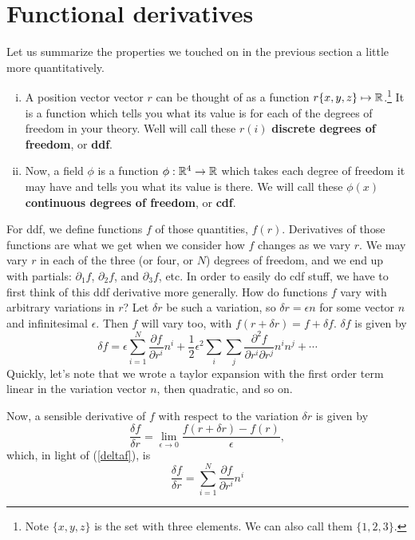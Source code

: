 \documentclass[main.tex]{subfiles}
\begin{document}
\section{Functional derivatives}
Let us summarize the properties we touched on in the previous section a little more quantitatively.
\begin{enumerate} [(i)]
\item A position vector vector $r$ can be thought of as a function $r \{x,y,z\} \mapsto \mathbb{R}$.\footnote{Note $\{x,y,z\}$ is the set with three elements. We can also call them $\{1,2,3\}$.} It is a function which tells you what its value is for each of the degrees of freedom in your theory. Well will call these $r(i)$ \textbf{discrete degrees of freedom}, or \textbf{ddf}.

\item Now, a field $\phi$ is a function $ \phi: \mathbb{R}^4 \rightarrow \mathbb{R}$ which takes each degree of freedom it may have and tells you what its value is there. We will call these $\phi(x)$ \textbf{continuous degrees of freedom}, or \textbf{cdf}.
\end{enumerate}

For ddf, we define functions $f$ of those quantities, $f(r)$. Derivatives of those functions are what we get when we consider how $f$ changes as we vary $r$. We may vary $r$ in each of the three (or four, or $N$) degrees of freedom, and we end up with partials: $\partial_1 f$, $\partial_2 f$, and $\partial_3 f$, etc. In order to easily do cdf stuff, we have to first think of this ddf derivative more generally. How do functions $f$ vary with arbitrary variations in $r$? Let $\delta r$ be such a variation, so $\delta r = \epsilon n$ for some vector $n$ and infinitesimal $\epsilon$.
Then $f$ will vary too, with $f(r + \delta r) = f + \delta f$. $\delta f$ is given by
\begin{equation} \label{deltaf}
\delta f = \epsilon \sum_{i = 1}^N \frac{\partial f}{\partial r^i} n^i + \frac{1}{2} \epsilon^2 \sum_i \sum_j \frac{\partial^2 f}{\partial r^i \partial r^j} n^i n^j + \cdots
\end{equation}
Quickly, let's note that we wrote a taylor expansion with the first order term linear in the variation vector $n$, then quadratic, and so on.

Now, a sensible derivative of $f$ with respect to the variation $\delta r$ is given by
\[
\frac{\delta f}{\delta r} = \lim_{\epsilon \to 0} \frac{f(r + \delta r) - f(r)}{\epsilon},
\]
which, in light of (\ref{deltaf}), is
\begin{equation} \label{dfdr}
\boxed{\frac{\delta f}{\delta r} = \sum_{i = 1}^N \frac{\partial f}{\partial r^i} n^i}
\end{equation}
\end{document}
